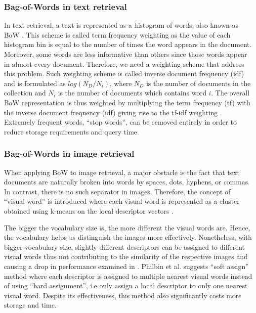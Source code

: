 \documentclass[10pt,conference,]{IEEEtran}
\begin{document}
\subsubsection{Bag-of-Words in text retrieval}\label{section:bow_text}
In text retrieval, a text is represented as a histogram of words, also known as BoW \cite{4}. This scheme is called term frequency weighting as the value of each histogram bin is equal to the number of times the word appears in the document.
Moreover, some words are less informative than others since those words appear in almost every document. Therefore, we need a weighting scheme that address this problem. Such weighting scheme is called inverse document frequency (idf) and is formulated as $log(N_{D} / N_{i})$, where $N_{D}$ is the number of documents in the collection and $N_{i}$ is the number of documents which contains word $i$. The overall BoW representation is thus weighted by multiplying the term frequency (tf) with the inverse document frequency (idf) giving rise to the tf-idf weighting \cite{4}. Extremely frequent words, ``stop words'', can be removed entirely in order to reduce storage requirements and query time.


\subsubsection{Bag-of-Words in image retrieval} \label{section:bow_image}
When applying BoW to image retrieval, a major obstacle is the fact that text documents are naturally broken into words by spaces, dots, hyphens, or commas. In contrast, there is no such separator in images. Therefore, the concept of ``visual word'' is introduced where each visual word is represented as a cluster obtained using k-means on the local descriptor vectors \cite{3}.

The bigger the vocabulary size is, the more different the visual words are. Hence, the vocabulary helps us distinguish the images more effectively. Nonetheless, with bigger vocabulary size, slightly different descriptors can be assigned to different visual words thus not contributing to the similarity of the respective images and causing a drop in performance examined in \cite{5, 6, 7}. Philbin et al. \cite{7} suggests ``soft assign'' method where each descriptor is assigned to multiple nearest visual words instead of using ``hard assignment'', i.e only assign a local descriptor to only one nearest visual word. Despite its effectiveness, this method also significantly costs more storage and time.
\end{document}
